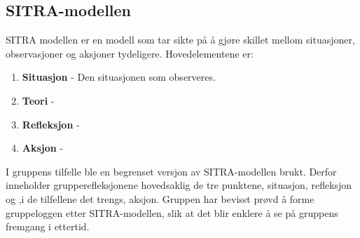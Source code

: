 \subsection{SITRA-modellen}
SITRA modellen er en modell som tar sikte på å gjøre skillet mellom situasjoner, observasjoner og aksjoner tydeligere.
Hovedelementene er:

\begin{enumerate}
  \item \textbf{Situasjon} - Den situasjonen som observeres.
  \item \textbf{Teori} - 
  \item \textbf{Refleksjon} -
  \item \textbf{Aksjon} - 
\end{enumerate}

I gruppens tilfelle ble en begrenset versjon av SITRA-modellen brukt. 
Derfor inneholder grupperefleksjonene hovedsaklig de tre punktene, situasjon, refleksjon og ,i de tilfellene det trengs, aksjon.
Gruppen har bevisst prøvd å forme gruppeloggen etter SITRA-modellen, slik at det blir enklere å se på gruppens fremgang i ettertid. 

